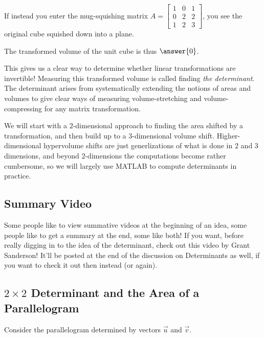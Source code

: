 \documentclass{ximera}
\begin{document}
If instead you enter the mug-squishing matrix $A=\begin{bmatrix}
  1&0&1\\0&2&2\\1&2&3
\end{bmatrix}$, you see the original cube squished down into a plane. 

The transformed volume of the unit cube is thus $\answer{0}$.

This gives us a clear way to determine whether linear transformations are invertible! Measuring this transformed volume is called finding \emph{the determinant}. The determinant arises from systematically extending the notions of areas and volumes to give clear ways of measuring volume-stretching and volume-compressing for any matrix transformation.

We will start with a $2$-dimensional approach to finding the area shifted by a transformation, and then build up to a $3$-dimensional volume shift. Higher-dimensional hypervolume shifts are just generlizations of what is done in $2$ and $3$ dimensions, and beyond $2$-dimensions the computations become rather cumbersome, so we will largely use MATLAB to compute determinants in practice. 

  \subsection*{Summary Video}
  Some people like to view summative videos at the beginning of an idea, some people like to get a summary at the end, some like both! If you want, before really digging in to the idea of the determinant, check out this video by Grant Sanderson! It'll be posted at the end of the discussion on Determinants as well, if you want to check it out then instead (or again).

  \begin{center}
\end{center}

    \subsection*{$2\times 2$ Determinant and the Area of a Parallelogram}
     
    Consider the parallelogram determined by vectors $\vec{u}$ and $\vec{v}$.
     
    \begin{center}
    \end{center}
\end{document}
